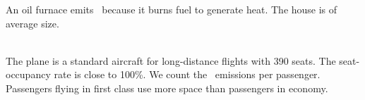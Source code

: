 \begin{enumerateb}
	An oil furnace emits \COtwo\ because it burns fuel to generate heat.
	The house is of average size. \\
	\item {} \\
	The plane is a standard aircraft for long-distance flights with 390 seats.
	The seat-occupancy rate is close to 100\%.
	We count the \COtwo\ emissions per passenger.
	Passengers flying in first class use more space than passengers in economy. \\
\end{enumerateb}
